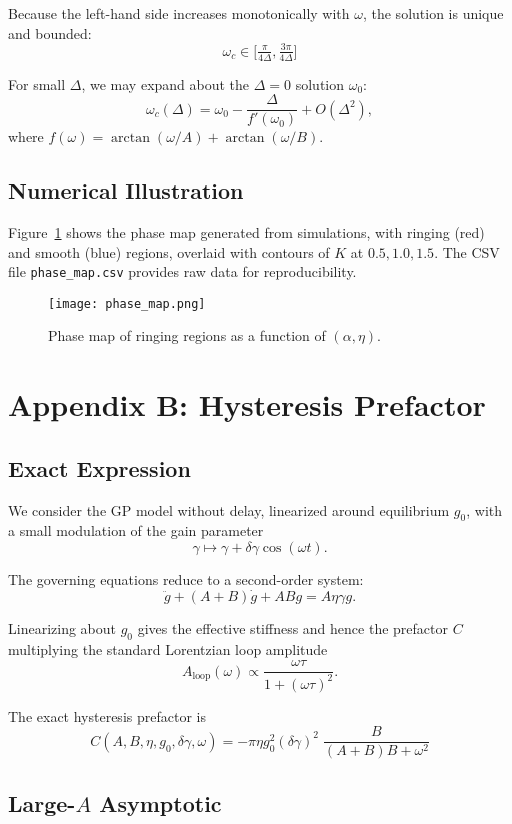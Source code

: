 \documentclass[12pt]{article}
\begin{document}
Because the left-hand side increases monotonically with $\omega$, the solution is unique and bounded:
\[
\boxed{ \;\omega_c \in \Big[\tfrac{\pi}{4\Delta}, \tfrac{3\pi}{4\Delta}\Big]\;}
\]

For small $\Delta$, we may expand about the $\Delta=0$ solution $\omega_0$:
\[
\omega_c(\Delta) = \omega_0 - \frac{\Delta}{f'(\omega_0)} + O(\Delta^2),
\]
where $f(\omega) = \arctan(\omega/A)+\arctan(\omega/B)$.

\subsection*{Numerical Illustration}

Figure~\ref{fig:phase_map} shows the phase map generated from simulations, with ringing (red) and smooth (blue) regions, overlaid with contours of $K$ at $0.5,1.0,1.5$.
The CSV file \texttt{phase\_map.csv} provides raw data for reproducibility.

\begin{figure}[h]
\centering
\texttt{[image: phase\_map.png]}
\caption{Phase map of ringing regions as a function of $(\alpha,\eta)$.}
\label{fig:phase_map}
\end{figure}
\section*{Appendix B: Hysteresis Prefactor}

\subsection*{Exact Expression}

We consider the GP model without delay, linearized around equilibrium $g_0$,
with a small modulation of the gain parameter
\[
\gamma \mapsto \gamma + \delta\gamma \cos(\omega t).
\]

The governing equations reduce to a second-order system:
\[
\ddot g + (A+B)\dot g + AB g = A \eta \gamma g.
\]

Linearizing about $g_0$ gives the effective stiffness and hence the
prefactor $C$ multiplying the standard Lorentzian loop amplitude
\[
A_{\text{loop}}(\omega) \propto \frac{\omega \tau}{1+(\omega \tau)^2}.
\]

The exact hysteresis prefactor is
\[
\boxed{
C(A,B,\eta,g_0,\delta\gamma,\omega) =
-\pi \eta g_0^2 (\delta\gamma)^2 \;
\frac{B}{(A+B)B + \omega^2}
}
\]

\subsection*{Large-$A$ Asymptotic}
\end{document}
